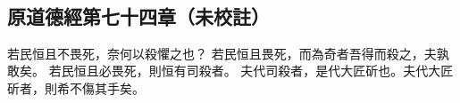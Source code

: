 ﻿%
%

\chapter{~}

\section{原道德經第七十四章（未校註）}

\begin{withgezhu}

\zhsong


\textcolor{tongjia-color}{若民恒且不畏死，奈何以殺懼之也}？
\textcolor{tongjia-color}{若民恒且畏死，而為奇者吾得而殺之，夫孰敢矣}。
\textcolor{tongjia-color}{若民恒且必畏死，則恒有司殺者}。
夫代司殺者，是代大匠斫也。夫代大匠斫者，則希不傷其手矣。

\end{withgezhu}
